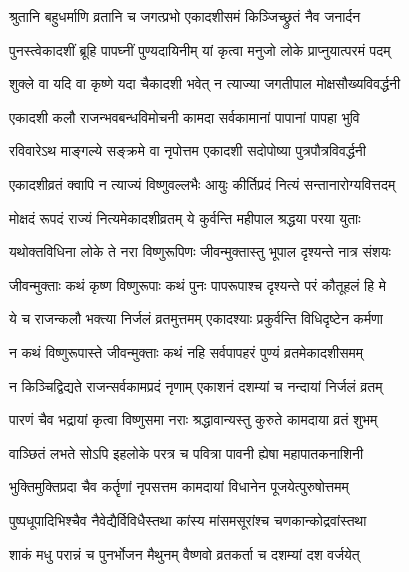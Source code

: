 
\twolineshloka
{श्रुतानि बहुधर्माणि व्रतानि च जगत्प्रभो}
{एकादशीसमं किञ्जिच्छ्रुतं नैव जनार्दन}%

\twolineshloka
{पुनस्त्वेकादशीं ब्रूहि पापघ्नीं पुण्यदायिनीम्}
{यां कृत्वा मनुजो लोके प्राप्नुयात्परमं पदम्}%


\twolineshloka
{शुक्ले वा यदि वा कृष्णे यदा चैकादशी भवेत्}
{न त्याज्या जगतीपाल मोक्षसौख्यविवर्द्धनी}%

\twolineshloka
{एकादशी कलौ राजन्भवबन्धविमोचनी}
{कामदा सर्वकामानां पापानां पापहा भुवि}%

\twolineshloka
{रविवारेऽथ माङ्गल्ये सङ्क्रमे वा नृपोत्तम}
{एकादशी सदोपोष्या पुत्रपौत्रविवर्द्धनी}%

\twolineshloka
{एकादशीव्रतं क्वापि न त्याज्यं विष्णुवल्लभैः}
{आयुः कीर्तिप्रदं नित्यं सन्तानारोग्यवित्तदम्}%

\twolineshloka
{मोक्षदं रूपदं राज्यं नित्यमेकादशीव्रतम्}
{ये कुर्वन्ति महीपाल श्रद्धया परया युताः}%

\twolineshloka
{यथोक्तविधिना लोके ते नरा विष्णुरूपिणः }
{जीवन्मुक्तास्तु भूपाल दृश्यन्ते नात्र संशयः}%


\twolineshloka
{जीवन्मुक्ताः कथं कृष्ण विष्णुरूपाः कथं पुनः}
{पापरूपाश्च दृश्यन्ते परं कौतूहलं हि मे}%


\twolineshloka
{ये च राजन्कलौ भक्त्या निर्जलं व्रतमुत्तमम्}
{एकादश्याः प्रकुर्वन्ति विधिदृष्टेन कर्मणा}%

\twolineshloka
{न कथं विष्णुरूपास्ते जीवन्मुक्ताः कथं नहि}
{सर्वपापहरं पुण्यं व्रतमेकादशीसमम्}%

\twolineshloka
{न किञ्चिद्विद्यते राजन्सर्वकामप्रदं नृणाम्}
{एकाशनं दशम्यां च नन्दायां निर्जलं व्रतम्}%

\twolineshloka
{पारणं चैव भद्रायां कृत्वा विष्णुसमा नराः}
{श्रद्धावान्यस्तु कुरुते कामदाया व्रतं शुभम्}%

\twolineshloka
{वाञ्छितं लभते सोऽपि इहलोके परत्र च}
{पवित्रा पावनी ह्येषा महापातकनाशिनी}%

\twolineshloka
{भुक्तिमुक्तिप्रदा चैव कर्तॄणां नृपसत्तम}
{कामदायां विधानेन पूजयेत्पुरुषोत्तमम्}%

\twolineshloka
{पुष्पधूपादिभिश्चैव नैवेद्यैर्विविधैस्तथा}
{कांस्य मांसमसूरांश्च चणकान्कोद्रवांस्तथा}%

\twolineshloka
{शाकं मधु परान्नं च पुनर्भोजन मैथुनम्}
{वैष्णवो व्रतकर्ता च दशम्यां दश वर्जयेत्}%

